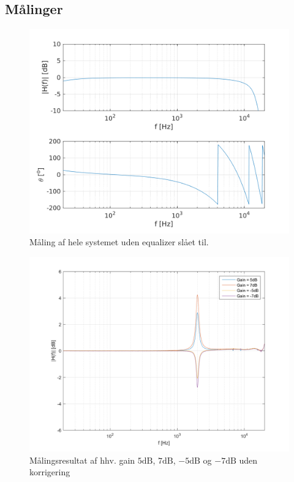 \subsection{Målinger}

\begin{figure}[h!]
	\centering
	\includegraphics[scale = 0.8]{matlabdemo/test/test_eq_off.png}  
	\caption{Måling af hele systemet uden equalizer slået til.}
	\label{fig:eq_off1}
\end{figure}

\begin{figure}[h!]
	\centering
	\includegraphics[scale = 0.8]{billeder/Gain_uden_hotfix}
	\caption{Målingsresultat af hhv. gain $5\si{\dB}$, $7\si{\dB}$, $-5\si{\dB}$ og $-7\si{\dB}$ uden korrigering}
	\label{fig:Gain_uden_hotfix}
\end{figure}

